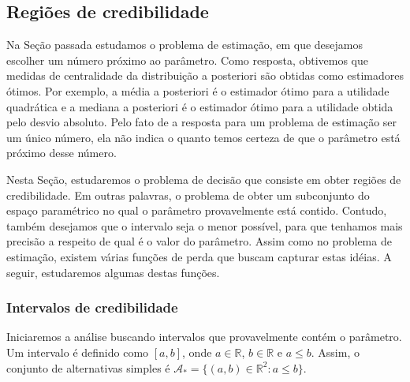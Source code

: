 \subsection{Regiões de credibilidade}

Na Seção passada estudamos 
o problema de estimação,
em que desejamos escolher 
um número próximo ao parâmetro.
Como resposta, obtivemos que 
medidas de centralidade da distribuição a posteriori
são obtidas como estimadores ótimos.
Por exemplo, a média a posteriori é 
o estimador ótimo para a utilidade quadrática e
a mediana a posteriori é o estimador ótimo para
a utilidade obtida pelo desvio absoluto.
Pelo fato de a resposta para 
um problema de estimação ser um único número,
ela não indica o quanto temos certeza de que
o parâmetro está próximo desse número.

Nesta Seção, estudaremos o problema de decisão que
consiste em obter regiões de credibilidade.
Em outras palavras, o problema de obter 
um subconjunto do espaço paramétrico no qual 
o parâmetro provavelmente está contido.
Contudo, também desejamos que o intervalo seja 
o menor possível, para que tenhamos mais 
precisão a respeito de qual é o valor do parâmetro.
Assim como no problema de estimação, 
existem várias funções de perda que
buscam capturar estas idéias. 
A seguir, estudaremos algumas destas funções.

\subsubsection{Intervalos de credibilidade}

Iniciaremos a análise buscando intervalos que 
provavelmente contém o parâmetro.
Um intervalo é definido como $[a,b]$, 
onde $a \in \mathbb{R}$, $b \in \mathbb{R}$ e 
$a \leq b$. Assim, o conjunto de alternativas simples é $\mathcal{A}_{*} = \{(a,b) \in \mathbb{R}^{2}: a \leq b\}$.

